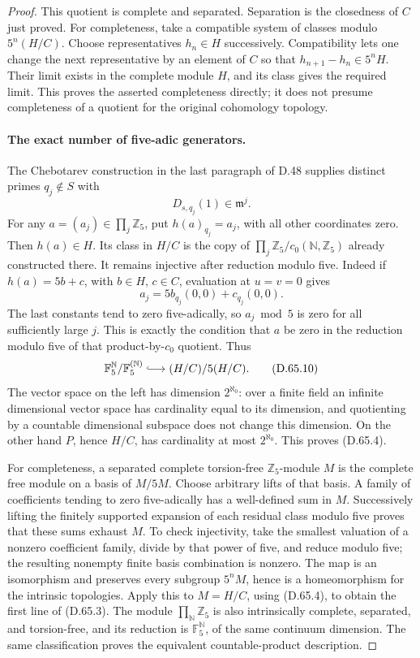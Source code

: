 \begin{proof}
This quotient is complete and separated. Separation
is the closedness of \(C\) just proved. For completeness,
take a compatible system of classes modulo
\(5^n(H/C)\). Choose representatives \(h_n\in H\)
successively. Compatibility lets one change the next
representative by an element of \(C\) so that
\(h_{n+1}-h_n\in5^nH\). Their limit exists in the
complete module \(H\), and its class gives the required
limit. This proves the asserted completeness directly;
it does not presume completeness of a quotient for
the original cohomology topology.

\paragraph{The exact number of five-adic generators.}
The Chebotarev construction in the last paragraph
of D.48 supplies distinct primes \(q_j\notin S\)
with
\[
                         D_{s,q_j}(1)\in\mathfrak m^j.
                                                        \tag{D.65.9}
\]
For any \(a=(a_j)\in\prod_j\mathbb Z_5\), put
\(h(a)_{q_j}=a_j\), with all other coordinates zero.
Then \(h(a)\in H\). Its class in \(H/C\) is the
copy of \(\prod_j\mathbb Z_5/c_0(\mathbb N,\mathbb Z_5)\)
already constructed there. It remains injective
after reduction modulo five. Indeed if
\(h(a)=5b+c\), with \(b\in H\), \(c\in C\), evaluation
at \(u=v=0\) gives
\[
                 a_j=5b_{q_j}(0,0)+c_{q_j}(0,0).
\]
The last constants tend to zero five-adically,
so \(a_j\bmod5\) is zero for all sufficiently large
\(j\). This is exactly the condition that \(a\)
be zero in the reduction modulo five of that
product-by-\(c_0\) quotient. Thus
\[
 \mathbb F_5^{\mathbb N}/\mathbb F_5^{(\mathbb N)}
             \lhook\joinrel\longrightarrow (H/C)/5(H/C).
                                                        \tag{D.65.10}
\]
The vector space on the left has dimension
\(2^{\aleph_0}\): over a finite field an infinite
dimensional vector space has cardinality equal
to its dimension, and quotienting by a countable
dimensional subspace does not change this dimension.
On the other hand \(P\), hence \(H/C\), has cardinality
at most \(2^{\aleph_0}\). This proves (D.65.4).

For completeness, a separated complete torsion-free
\(\mathbb Z_5\)-module \(M\) is the complete free module
on a basis of \(M/5M\). Choose arbitrary lifts of that
basis. A family of coefficients tending to zero
five-adically has a well-defined sum in \(M\).
Successively lifting the finitely supported expansion
of each residual class modulo five proves that these
sums exhaust \(M\). To check injectivity, take the
smallest valuation of a nonzero coefficient family,
divide by that power of five, and reduce modulo five;
the resulting nonempty finite basis combination is
nonzero. The map is an isomorphism and preserves
every subgroup \(5^nM\), hence is a homeomorphism
for the intrinsic topologies. Apply this to
\(M=H/C\), using (D.65.4), to obtain the first line
of (D.65.3).
The module \(\prod_{\mathbb N}\mathbb Z_5\) is also
intrinsically complete, separated, and torsion-free,
and its reduction is \(\mathbb F_5^{\mathbb N}\),
of the same continuum dimension. The same classification
proves the equivalent countable-product description.


\end{proof}
